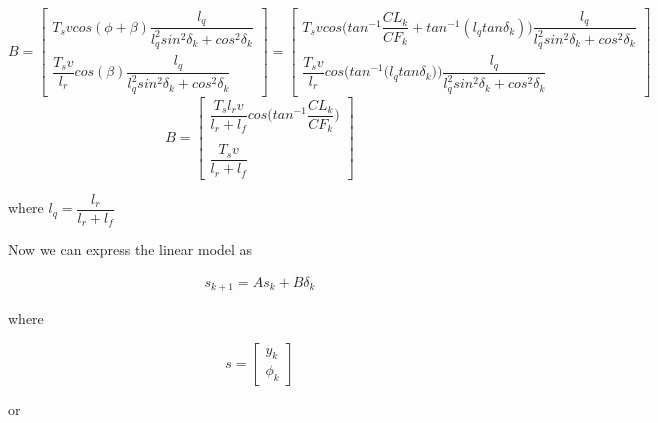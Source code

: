 \documentclass[oneside,12pt]{article}
\begin{document}
    \begin{equation}
     B =
      \begin{bmatrix}
        T_s v cos(\phi + \beta) \dfrac{l_q}{l_q^2 sin^2\delta_k + cos^2\delta_k} \\
        \dfrac{T_s v}{l_r} cos(\beta) \dfrac{l_q}{l_q^2 sin^2\delta_k + cos^2\delta_k}
      \end{bmatrix}
      =
      \begin{bmatrix}
        T_s v cos\Big(tan^{-1}\dfrac{CL_k}{CF_k} + tan^{-1} (l_q tan\delta_k)\Big) \dfrac{l_q}{l_q^2 sin^2\delta_k + cos^2\delta_k} \\
        \dfrac{T_s v}{l_r} cos\Bigg(tan^{-1} \Big(l_q tan\delta_k\Big)\Bigg) \dfrac{l_q}{l_q^2 sin^2\delta_k + cos^2\delta_k}
      \end{bmatrix}
    \end{equation}
    \begin{equation}
     B =
      \begin{bmatrix}
        \dfrac{T_s l_r v}{l_r + l_f} cos\Big(tan^{-1}\dfrac{CL_k}{CF_k}\Big) \\\\
        \dfrac{T_s v}{l_r+l_f}
      \end{bmatrix}
    \end{equation}

    where $l_q = \dfrac{l_r}{l_r + l_f}$




  Now we can express the linear model as

    \begin{align}
      s_{k+1} = A s_k + B \delta_k
    \end{align}

    where

    \begin{equation}
      s=
      \begin{bmatrix}
        y_{k} \\
        \phi_{k}
      \end{bmatrix}
    \end{equation}

    or
\end{document}
